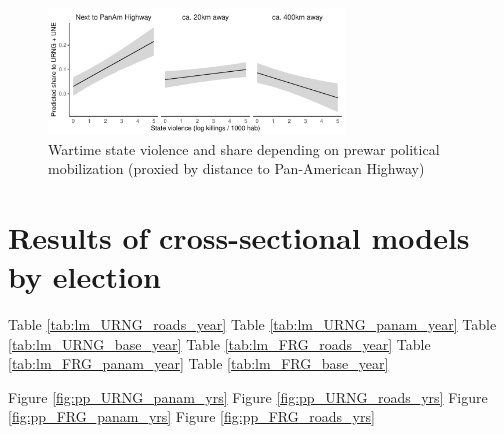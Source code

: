 \documentclass[a4paper, 12pt, notitlepage]{article}
\begin{document}
\begin{figure}[htb!]
  \centering
    \includegraphics[width = 0.7\textwidth]{img/pp_fullizq_panam}

  \caption{Wartime state violence and {} share depending on prewar political mobilization (proxied by distance to Pan-American Highway)} \label{fig:pp_fullizq_panam}

\end{figure}


\clearpage
\section{Results of cross-sectional models by election}\label{app:results_year}

Table \ref{tab:lm_URNG_roads_year}
Table \ref{tab:lm_URNG_panam_year}
Table \ref{tab:lm_URNG_base_year}
Table \ref{tab:lm_FRG_roads_year}
Table \ref{tab:lm_FRG_panam_year}
Table \ref{tab:lm_FRG_base_year}

Figure \ref{fig:pp_URNG_panam_yrs}
Figure \ref{fig:pp_URNG_roads_yrs}
Figure \ref{fig:pp_FRG_panam_yrs}
Figure \ref{fig:pp_FRG_roads_yrs}







\end{document}
